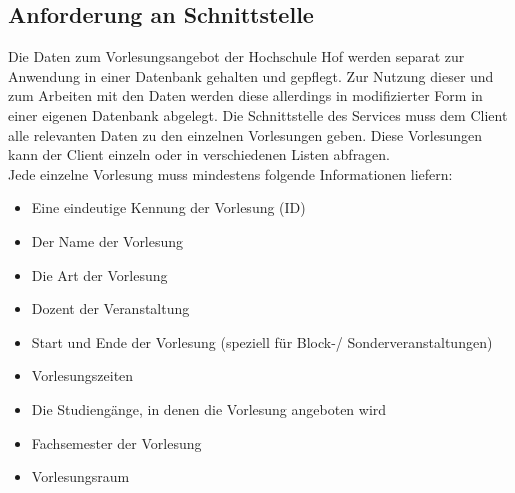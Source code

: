 \subsection*{Anforderung an Schnittstelle}
\label{sec:stundenplan_anforderung}

Die Daten zum Vorlesungsangebot der Hochschule Hof werden separat zur Anwendung in einer Datenbank gehalten und gepflegt. Zur Nutzung dieser und zum Arbeiten mit den Daten werden diese allerdings in modifizierter Form in einer eigenen Datenbank abgelegt. Die Schnittstelle des Services muss dem Client alle relevanten Daten zu den einzelnen Vorlesungen geben. Diese Vorlesungen kann der Client einzeln oder in verschiedenen Listen abfragen. 
\\
\linebreak
Jede einzelne Vorlesung muss mindestens folgende Informationen liefern:

\begin{itemize}

\item Eine eindeutige Kennung der Vorlesung (ID)

\item Der Name der Vorlesung

\item Die Art der Vorlesung

\item Dozent der Veranstaltung

\item Start und Ende der Vorlesung (speziell für Block-/ Sonderveranstaltungen)

\item Vorlesungszeiten

\item Die Studiengänge, in denen die Vorlesung angeboten wird

\item Fachsemester der Vorlesung

\item Vorlesungsraum

\end{itemize}

